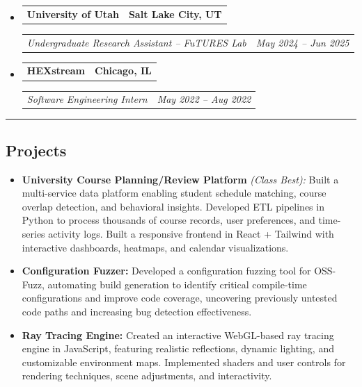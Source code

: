 \documentclass[10pt,letterpaper]{article}
\makeatletter
\newcommand{\headerrow}[2]
{\begin{tabular*}{\linewidth}{l@{\extracolsep{\fill}}r}
#1 &
#2 \\
\end{tabular*}}
\makeatother
\begin{document}
\begin{itemize}[leftmargin=1em]
	\item
	      \headerrow
	      {\textbf{University of Utah}}
	      {\textbf{Salt Lake City, UT}}
	      \headerrow
	      {\emph{Undergraduate Research Assistant -- FuTURES Lab}}
	      {\emph{May 2024 -- Jun 2025}}

	\item
	      \headerrow
	      {\textbf{HEXstream}}
	      {\textbf{Chicago, IL}}
	      \headerrow
	      {\emph{Software Engineering Intern}}
	      {\emph{May 2022 -- Aug 2022}}
\end{itemize}
\hrule
{}

\vspace{-1em}
\subsection*{\Large Projects}
\begin{itemize}[leftmargin=1em,noitemsep]
\item \textbf{University Course Planning/Review Platform} \emph{(Class Best):} Built a multi-service data platform enabling student schedule matching, course overlap detection, and behavioral insights. Developed ETL pipelines in Python to process thousands of course records, user preferences, and time-series activity logs. Built a responsive frontend in React + Tailwind with interactive dashboards, heatmaps, and calendar visualizations.
\item \textbf{Configuration Fuzzer:} Developed a configuration fuzzing tool for OSS-Fuzz, automating build generation to identify critical compile-time configurations and improve code coverage, uncovering previously untested code paths and increasing bug detection effectiveness.
\item \textbf{Ray Tracing Engine:} Created an interactive WebGL-based ray tracing engine in JavaScript, featuring realistic reflections, dynamic lighting, and customizable environment maps. Implemented shaders and user controls for rendering techniques, scene adjustments, and interactivity.
\end{itemize}
\end{document}
